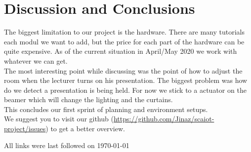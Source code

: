 \documentclass[runningheads]{llncs}
\begin{document}
\section{Discussion and Conclusions}
The biggest limitation to our project is the hardware. There are many tutorials each modul we want to add, but the price for each part of the hardware can be quite expensive. As of the current situation in April/May 2020 we work with whatever we can get.\\

The most interesting point while discussing was the point of how to adjust the room when the lecturer turns on his presentation. The biggest problem was how do we detect a presentation is being held. For now we stick to a actuator on the beamer which will change the lighting and the curtains.\\

This concludes our first sprint of planning and environment setups.\\
We suggest you to visit our github (\href{https://github.com/Jinaz/scaiot-project}{https://github.com/Jinaz/scaiot-project/issues}) to get a better overview.

%
%



All links were last followed on \today
\end{document}
